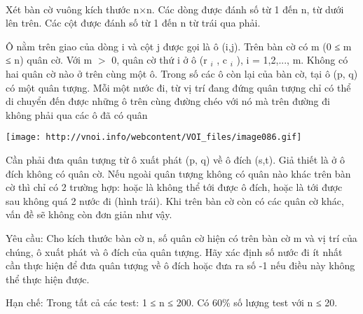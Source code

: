  

Xét bàn cờ vuông kích thước n×n. Các dòng được đánh số từ 1 đến n, từ dưới lên trên. Các cột được đánh số từ 1 đến n từ trái qua phải.

Ô nằm trên giao của dòng i và cột j được gọi là ô (i,j). Trên bàn cờ có m (0 ≤ m ≤ n) quân cờ. Với m $>$ 0, quân cờ thứ i ở ô (r $_ i $ , c $_ i $ ), i = 1,2,..., m. Không có hai quân cờ nào ở trên cùng một ô. Trong số các ô còn lại của bàn cờ, tại ô (p, q) có một quân tượng. Mỗi một nước đi, từ vị trí đang đứng quân tượng chỉ có thể di chuyển đến được những ô trên cùng đường chéo với nó mà trên đường đi không phải qua các ô đã có quân


\texttt{[image: http://vnoi.info/webcontent/VOI\_files/image086.gif]}

Cần phải đưa quân tượng từ ô xuất phát (p, q) về ô đích (s,t). Giả thiết là ở ô đích không có quân cờ. Nếu ngoài quân tượng không có quân nào khác trên bàn cờ thì chỉ có 2 trường hợp: hoặc là không thể tới được ô đích, hoặc là tới được sau không quá 2 nước đi (hình trái). Khi trên bàn cờ còn có các quân cờ khác, vấn đề sẽ không còn đơn giản như vậy.

Yêu cầu: Cho kích thước bàn cờ n, số quân cờ hiện có trên bàn cờ m và vị trí của chúng, ô xuất phát và ô đích của quân tượng. Hãy xác định số nước đi ít nhất cần thực hiện để đưa quân tượng về ô đích hoặc đưa ra số -1 nếu điều này không thể thực hiện được.

Hạn chế:
Trong tất cả các test: 1 ≤ n ≤ 200. Có 60\% số lượng test với n ≤ 20.